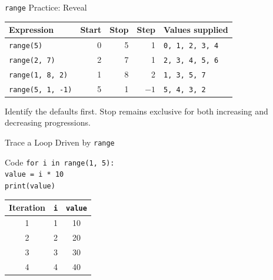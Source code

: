 \documentclass[aspectratio=169,10pt]{beamer}
\begin{document}
\begin{frame}{\texttt{range} Practice: Reveal}
  \begin{center}
    \renewcommand{\arraystretch}{1.5}
    \begin{tabular}{l|r|r|r|l}
      \textbf{Expression} & \textbf{Start} & \textbf{Stop} & \textbf{Step} & \textbf{Values supplied} \\\hline
      \texttt{range(5)} & 0 & 5 & 1 & \texttt{0, 1, 2, 3, 4} \\
      \texttt{range(2, 7)} & 2 & 7 & 1 & \texttt{2, 3, 4, 5, 6} \\
      \texttt{range(1, 8, 2)} & 1 & 8 & 2 & \texttt{1, 3, 5, 7} \\
      \texttt{range(5, 1, -1)} & 5 & 1 & $-1$ & \texttt{5, 4, 3, 2}
    \end{tabular}
  \end{center}
  \begin{keyidea}
    Identify the defaults first. Stop remains exclusive for both increasing and decreasing progressions.
  \end{keyidea}
\end{frame}

\begin{frame}{Trace a Loop Driven by \texttt{range}}
  \begin{block}{Code}
    \texttt{for i in range(1, 5):}\\
    \hspace{0.20in}\texttt{value = i * 10}\\
    \hspace{0.20in}\texttt{print(value)}
  \end{block}

  \begin{center}
    \renewcommand{\arraystretch}{1.3}
    \begin{tabular}{c|c|c}
      \textbf{Iteration} & \textbf{\texttt{i}} & \textbf{\texttt{value}} \\\hline
      1 & 1 & 10 \\
      2 & 2 & 20 \\
      3 & 3 & 30 \\
      4 & 4 & 40
    \end{tabular}
  \end{center}
\end{frame}
\end{document}

